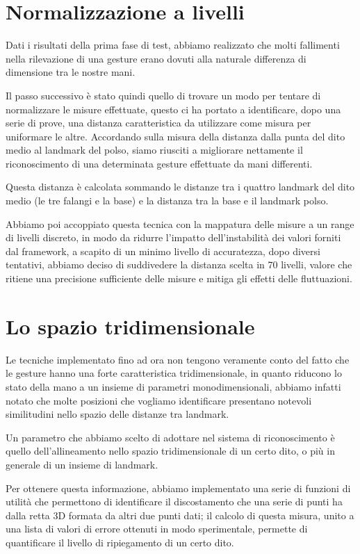 \section{Normalizzazione a livelli}

Dati i risultati della prima fase di test, abbiamo realizzato che molti fallimenti nella rilevazione di una gesture erano dovuti alla naturale differenza di dimensione tra le nostre mani.

Il passo successivo è stato quindi quello di trovare un modo per tentare di normalizzare le misure effettuate, questo ci ha portato a identificare, dopo una serie di prove, una distanza caratteristica da utilizzare come misura per uniformare le altre. Accordando sulla misura della distanza dalla punta del dito medio al landmark del polso, siamo riusciti a migliorare nettamente il riconoscimento di una determinata gesture effettuate da mani differenti.

Questa distanza è calcolata sommando le distanze tra i quattro landmark del dito medio (le tre falangi e la base) e la distanza tra la base e il landmark polso.

Abbiamo poi accoppiato questa tecnica con la mappatura delle misure a un range di livelli discreto, in modo da ridurre l'impatto dell'instabilità dei valori forniti dal framework, a scapito di un minimo livello di accuratezza, dopo diversi tentativi, abbiamo deciso di suddivedere la distanza scelta in 70 livelli, valore che ritiene una precisione sufficiente delle misure e mitiga gli effetti delle fluttuazioni.

\section{Lo spazio tridimensionale}

Le tecniche implementato fino ad ora non tengono veramente conto del fatto che le gesture hanno una forte caratteristica tridimensionale, in quanto riducono lo stato della mano a un insieme di parametri monodimensionali, abbiamo infatti notato che molte posizioni che vogliamo identificare presentano notevoli similitudini nello spazio delle distanze tra landmark.

Un parametro che abbiamo scelto di adottare nel sistema di riconoscimento è quello dell'allineamento nello spazio tridimensionale di un certo dito, o più in generale di un insieme di landmark.

Per ottenere questa informazione, abbiamo implementato una serie di funzioni di utilità che permettono di identificare il discostamento che una serie di punti ha dalla retta 3D formata da altri due punti dati; il calcolo di questa misura, unito a una lista di valori di errore ottenuti in modo sperimentale, permette di quantificare il livello di ripiegamento di un certo dito.

